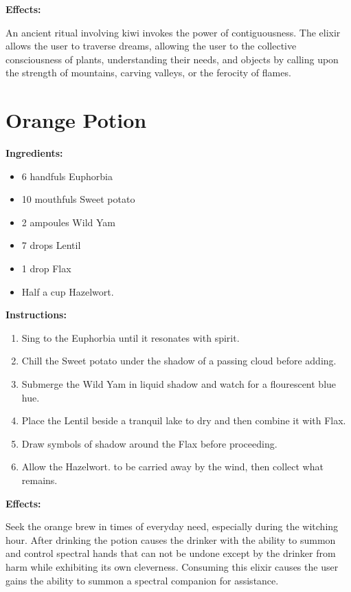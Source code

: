 \documentclass{article}
\begin{document}
\textbf{Effects:}

An ancient ritual involving kiwi invokes the power of contiguousness. The elixir allows the user to traverse dreams, allowing the user to the collective consciousness of plants, understanding their needs, and objects by calling upon the strength of mountains, carving valleys, or the ferocity of flames.

\newpage
\section*{Orange Potion}

\textbf{Ingredients:}

\begin{itemize}
  \item 6 handfuls Euphorbia
  \item 10 mouthfuls Sweet potato
  \item 2 ampoules Wild Yam
  \item 7 drops Lentil
  \item 1 drop Flax
  \item Half a cup Hazelwort.
\end{itemize}

\textbf{Instructions:}

\begin{enumerate}
  \item Sing to the Euphorbia until it resonates with spirit.
  \item Chill the Sweet potato under the shadow of a passing cloud before adding.
  \item Submerge the Wild Yam in liquid shadow and watch for a flourescent blue hue.
  \item Place the Lentil beside a tranquil lake to dry and then combine it with Flax.
  \item Draw symbols of shadow around the Flax before proceeding.
  \item Allow the Hazelwort. to be carried away by the wind, then collect what remains.
\end{enumerate}

\textbf{Effects:}

Seek the orange brew in times of everyday need, especially during the witching hour. After drinking the potion causes the drinker with the ability to summon and control spectral hands that can not be undone except by the drinker from harm while exhibiting its own cleverness. Consuming this elixir causes the user gains the ability to summon a spectral companion for assistance.
\end{document}
